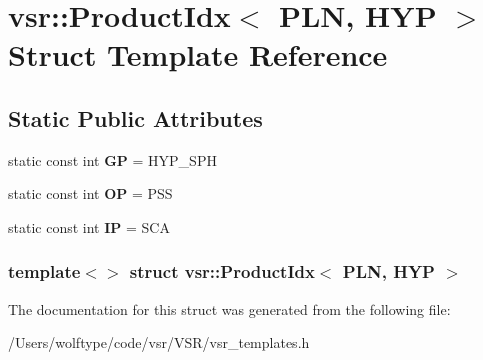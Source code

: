 \hypertarget{structvsr_1_1_product_idx_3_01_p_l_n_00_01_h_y_p_01_4}{\section{vsr\-:\-:Product\-Idx$<$ P\-L\-N, H\-Y\-P $>$ Struct Template Reference}
\label{structvsr_1_1_product_idx_3_01_p_l_n_00_01_h_y_p_01_4}
}
\subsection*{Static Public Attributes}
\begin{DoxyCompactItemize}
\item 
\hypertarget{structvsr_1_1_product_idx_3_01_p_l_n_00_01_h_y_p_01_4_a475bbc2b5ea72e1474a8e904f700df54}{static const int {\bfseries G\-P} = H\-Y\-P\-\_\-\-S\-P\-H}\label{structvsr_1_1_product_idx_3_01_p_l_n_00_01_h_y_p_01_4_a475bbc2b5ea72e1474a8e904f700df54}

\item 
\hypertarget{structvsr_1_1_product_idx_3_01_p_l_n_00_01_h_y_p_01_4_a77c84789cb805c1119839b224294faa4}{static const int {\bfseries O\-P} = P\-S\-S}\label{structvsr_1_1_product_idx_3_01_p_l_n_00_01_h_y_p_01_4_a77c84789cb805c1119839b224294faa4}

\item 
\hypertarget{structvsr_1_1_product_idx_3_01_p_l_n_00_01_h_y_p_01_4_aa7c2fd257cfce3030d50b0a0be15bc6e}{static const int {\bfseries I\-P} = S\-C\-A}\label{structvsr_1_1_product_idx_3_01_p_l_n_00_01_h_y_p_01_4_aa7c2fd257cfce3030d50b0a0be15bc6e}

\end{DoxyCompactItemize}
\subsubsection*{template$<$$>$ struct vsr\-::\-Product\-Idx$<$ P\-L\-N, H\-Y\-P $>$}



The documentation for this struct was generated from the following file\-:\begin{DoxyCompactItemize}
\item 
/\-Users/wolftype/code/vsr/\-V\-S\-R/vsr\-\_\-templates.\-h\end{DoxyCompactItemize}
